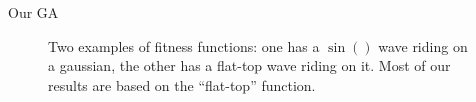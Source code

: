 \documentclass[10pt,aspectratio=169]{beamer}
\begin{document}
\begin{frame}{Our GA}
	\begin{figure}
		\centering
		\caption{Two examples of fitness functions: one has a $\sin()$ wave
		riding on a gaussian, the other has a flat-top wave riding on it.
		Most of our results are based on the ``flat-top'' function.}
		\label{fig:fit-func_pid3095791}
	\end{figure}
\end{frame}
\end{document}
